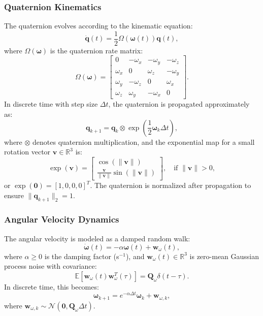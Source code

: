 \documentclass[11pt]{article}
\begin{document}
\subsubsection{Quaternion Kinematics}
The quaternion evolves according to the kinematic equation:
\[
\dot{\mathbf{q}}(t) = \frac{1}{2} \Omega(\boldsymbol{\omega}(t)) \mathbf{q}(t),
\]
where \(\Omega(\boldsymbol{\omega})\) is the quaternion rate matrix:
\[
\Omega(\boldsymbol{\omega}) = \begin{bmatrix}
0 & -\omega_x & -\omega_y & -\omega_z \\
\omega_x & 0 & \omega_z & -\omega_y \\
\omega_y & -\omega_z & 0 & \omega_x \\
\omega_z & \omega_y & -\omega_x & 0
\end{bmatrix}.
\]
In discrete time with step size \(\Delta t\), the quaternion is propagated approximately as:
\[
\mathbf{q}_{k+1} = \mathbf{q}_k \otimes \exp\left(\frac{1}{2} \boldsymbol{\omega}_k \Delta t\right),
\]
where \(\otimes\) denotes quaternion multiplication, and the exponential map for a small rotation vector \(\mathbf{v} \in \mathbb{R}^3\) is:
\[
\exp(\mathbf{v}) = \begin{bmatrix} \cos(\|\mathbf{v}\|) \\ \frac{\mathbf{v}}{\|\mathbf{v}\|} \sin(\|\mathbf{v}\|) \end{bmatrix}, \quad \text{if } \|\mathbf{v}\| > 0,
\]
or \(\exp(\mathbf{0}) = [1, 0, 0, 0]^T\). The quaternion is normalized after propagation to ensure \(\|\mathbf{q}_{k+1}\|_2 = 1\).

\subsubsection{Angular Velocity Dynamics}
The angular velocity is modeled as a damped random walk:
\[
\dot{\boldsymbol{\omega}}(t) = -\alpha \boldsymbol{\omega}(t) + \mathbf{w}_{\omega}(t),
\]
where \(\alpha \geq 0\) is the damping factor (s\(^{-1}\)), and \(\mathbf{w}_{\omega}(t) \in \mathbb{R}^3\) is zero-mean Gaussian process noise with covariance:
\[
\mathbb{E}[\mathbf{w}_{\omega}(t) \mathbf{w}_{\omega}^T(\tau)] = \mathbf{Q}_{\omega} \delta(t - \tau).
\]
In discrete time, this becomes:
\[
\boldsymbol{\omega}_{k+1} = e^{-\alpha \Delta t} \boldsymbol{\omega}_k + \mathbf{w}_{\omega,k},
\]
where \(\mathbf{w}_{\omega,k} \sim \mathcal{N}(\mathbf{0}, \mathbf{Q}_{\omega} \Delta t)\).
\end{document}
